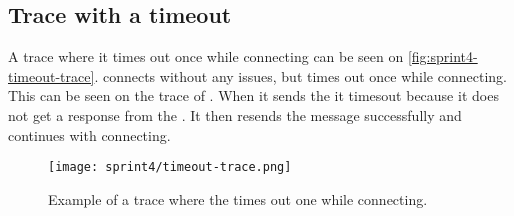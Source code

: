 \subsection{Trace with a timeout}
A trace where it times out once while connecting can be seen on \autoref{fig:sprint4-timeout-trace}.
 connects without any issues, but  times out once while connecting.
This can be seen on the trace of . When it sends the  it timesout because it does not get a response from the .
It then resends the message successfully and continues with connecting.
\begin{figure}[h]
    \centering
    \texttt{[image: sprint4/timeout-trace.png]}
    \caption{Example of a trace where the  times out one while connecting.}
    \label{fig:sprint4-timeout-trace}
\end{figure}
